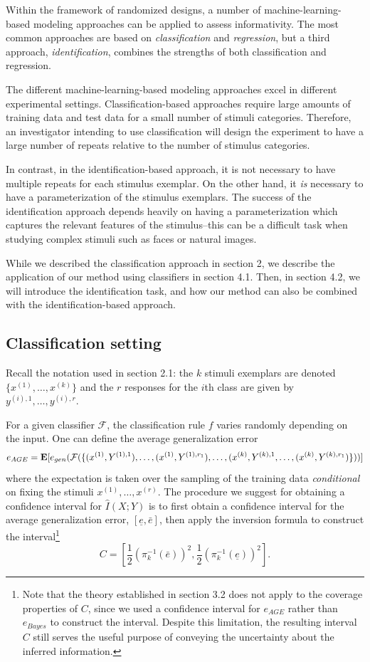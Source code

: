 \documentclass[12pt]{article}
\begin{document}
Within the framework of randomized designs, a number of
machine-learning-based modeling approaches can be applied to assess
informativity.  The most common approaches are based
on \emph{classification} and \emph{regression}, but a third
approach, \emph{identification}, combines the strengths of both
classification and regression.

The different machine-learning-based modeling approaches excel in
different experimental settings.  Classification-based approaches
require large amounts of training data and test data for a small
number of stimuli categories.  Therefore, an investigator intending to
use classification will design the experiment to have a large number
of repeats relative to the number of stimulus categories.

In contrast, in the identification-based approach, it is not necessary
to have multiple repeats for each stimulus exemplar.  On the other
hand, it \emph{is} necessary to have a parameterization of the
stimulus exemplars.  The success of the identification approach
depends heavily on having a parameterization which captures the
relevant features of the stimulus--this can be a difficult task when
studying complex stimuli such as faces or natural images.

While we described the classification
approach in section 2, we describe the application of our method using
classifiers in section 4.1.  Then, in section 4.2, we will introduce
the identification task, and how our method can also be combined with
the identification-based approach.


\subsection{Classification setting}

Recall the notation used in section 2.1: the $k$ stimuli exemplars are
denoted $\{x^{(1)},\hdots, x^{(k)}\}$ and the $r$ responses for the
$i$th class are given by $y^{(i), 1},\hdots, y^{(i), r}$.

For a given classifier $\mathcal{F}$, the classification rule $f$ varies randomly depending on the input.
One can define the average generalization error
\[
e_{AGE} = \textbf{E}[e_{gen}(\mathcal{F}(\{(x^{(1)}, Y^{(1),1}),\hdots, (x^{(1)},Y^{(1),r_1}), \hdots, (x^{(k)}, Y^{(k),1},\hdots, (x^{(k)},Y^{(k), r_1})\}))]
\]
where the expectation is taken over the sampling of the training
data \emph{conditional} on fixing the stimuli $x^{(1)},\hdots,
x^{(r)}.$ The procedure we suggest for obtaining a confidence interval
for $\hat{I}(X; Y)$ is to first obtain a confidence interval for the
average generalization error, $[\underline{e}, \bar{e}]$, then apply
the inversion formula to construct the interval\footnote{Note that the theory established in section 3.2 does not apply to the
coverage properties of $C$, since we used a confidence interval for
$e_{AGE}$ rather than $e_{Bayes}$ to construct the interval.  Despite
this limitation, the resulting interval $C$ still serves the useful
purpose of conveying the uncertainty about the inferred information.}
\[
C = [\frac{1}{2}(\pi_k^{-1}(\bar{e}))^2, \frac{1}{2}(\pi_k^{-1}(\underline{e}))^2].
\]
\end{document}
